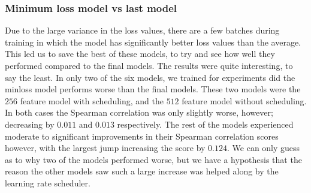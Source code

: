 \subsubsection{Minimum loss model vs last model}
Due to the large variance in the loss values, there are a few batches during training in which the model has significantly better loss values than the average. This led us to save the best of these models, to try and see how well they performed compared to the final models. The results were quite interesting, to say the least. In only two of the six models, we trained for experiments did the minloss model performs worse than the final models. These two models were the $256$ feature model with scheduling, and the $512$ feature model without scheduling. In both cases the Spearman correlation was only slightly worse, however; decreasing by $0.011$ and $0.013$ respectively. The rest of the models experienced moderate to significant improvements in their Spearman correlation scores however, with the largest jump increasing the score by $0.124$. We can only guess as to why two of the models performed worse, but we have a hypothesis that the reason the other models saw such a large increase was helped along by the learning rate scheduler.